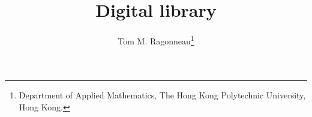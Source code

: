\documentclass{article}
\title{Digital library}
\author{Tom M. Ragonneau\thanks{Department of Applied Mathematics, The Hong Kong Polytechnic University, Hong Kong.}}
\date{\DTMnow}
\begin{document}
\maketitle

\nocite{*}


\end{document}

